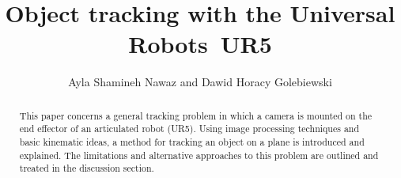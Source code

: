 \documentclass[letterpaper, 10 pt, conference]{ieeeconf}  %
\title{\LARGE \bf
	Object tracking with the Universal Robots\texttrademark \ UR5
}
\author{Ayla Shamineh Nawaz and Dawid Horacy Golebiewski}%
\begin{document}
\maketitle
\thispagestyle{empty}
\pagestyle{empty}


\begin{abstract}
This paper concerns a general tracking problem in which a camera is mounted on the end effector of an articulated robot (UR5). Using image processing techniques and basic kinematic ideas, a method for tracking an object on a plane is introduced and explained. The limitations and alternative approaches to this problem are outlined and treated in the discussion section.
\end{abstract}


\end{document}
